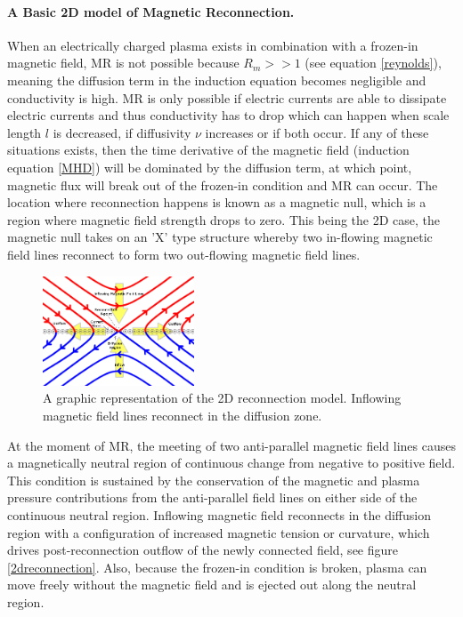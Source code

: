 \paragraph{A Basic 2D model of Magnetic Reconnection.}
When an electrically charged plasma exists in combination with a frozen-in magnetic field, MR is not possible because $R_{m} >> 1$ (see equation \ref{reynolds}), meaning the diffusion term in the induction equation becomes negligible and conductivity is high. MR is only possible if electric currents are able to dissipate electric currents and thus conductivity has to drop which can happen when scale length $l$ is decreased, if diffusivity $\nu$ increases or if both occur. If any of these situations exists, then the time derivative of the magnetic field (induction equation \ref{MHD}) will be dominated by the diffusion term, at which point, magnetic flux will break out of the frozen-in condition and MR can occur. The location where reconnection happens is known as a magnetic null, which is a region where magnetic field strength drops to zero. This being the 2D case, the magnetic null takes on an 'X' type structure whereby two in-flowing magnetic field lines reconnect to form two out-flowing magnetic field lines. 
\begin{figure}[H]
  \begin{center}
  \includegraphics[width=0.40\textwidth]{2d-reconnection}
  \caption{A graphic representation of the 2D reconnection model. Inflowing magnetic field lines reconnect in the diffusion zone.}\label{2d-reconnection}
\end{center}
\end{figure}%
At the moment of MR, the meeting of two anti-parallel magnetic field lines causes a magnetically neutral region of continuous change from negative to positive field. This condition is sustained by the conservation of the magnetic and plasma pressure contributions from the anti-parallel field lines on either side of the continuous neutral region. Inflowing magnetic field reconnects in the diffusion region with a configuration of increased magnetic tension or curvature, which drives post-reconnection outflow of the newly connected field, see figure \ref{2dreconnection}. Also, because the frozen-in condition is broken, plasma can move freely without the magnetic field and is ejected out along the neutral region.

